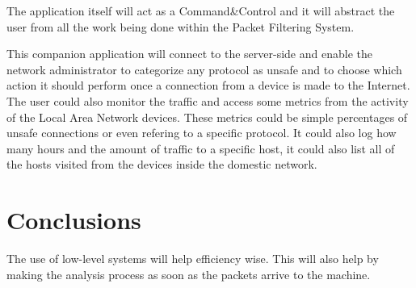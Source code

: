 The application itself will act as a Command\&Control and it will abstract the
user from all the work being done within the Packet Filtering System.

This companion application will connect to the server-side and enable the
network administrator to categorize any protocol as unsafe and to choose which
action it should perform once a connection from a device is made to the
Internet. The user could also monitor the traffic and access some metrics from
the activity of the Local Area Network devices. These metrics could be simple
percentages of unsafe connections or even refering to a specific protocol. It
could also log how many hours and the amount of traffic to a specific host, it
could also list all of the hosts visited from the devices inside the domestic
network.


\section{Conclusions}
\label{chap3:sec:concs}
The use of low-level systems will help efficiency wise. This will also help by
making the analysis process as soon as the packets arrive to the machine.
